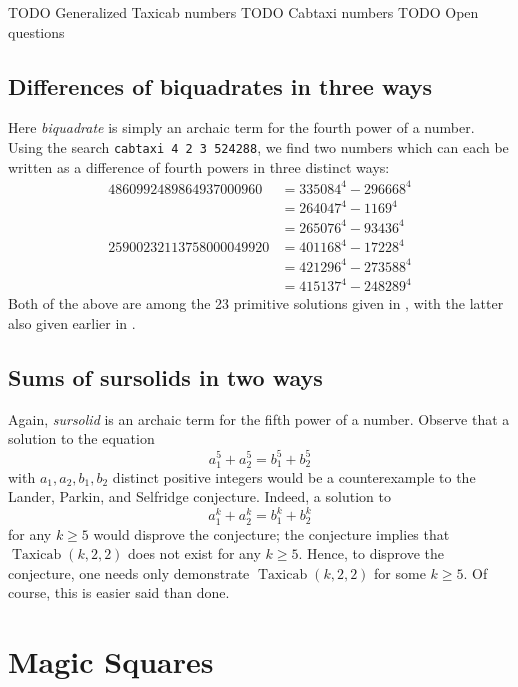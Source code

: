 \documentclass[11pt]{amsart}
\begin{document}
TODO Generalized Taxicab numbers
TODO Cabtaxi numbers
TODO Open questions

\subsection{Differences of biquadrates in three ways}
Here \emph{biquadrate} is simply an archaic term for the fourth power of a number. Using the search \texttt{cabtaxi 4 2 3 524288}, we find two numbers which can each be written as a difference of fourth powers in three distinct ways:
\begin{align*}
  4860992489864937000960 &= 335084^4 - 296668^4 \\
  &= 264047^4 - 1169^4 \\
  &= 265076^4 - 93436^4 \\
  25900232113758000049920 &= 401168^4 - 17228^4 \\
  &= 421296^4 - 273588^4 \\
  &= 415137^4 - 248289^4
\end{align*}
Both of the above are among the 23 primitive solutions given in \cite{CW07}, with the latter also given earlier in \cite{Zaj83}.

\subsection{Sums of sursolids in two ways}
Again, \emph{sursolid} is an archaic term for the fifth power of a number. Observe that a solution to the equation
\begin{equation*}
  a_1^5 + a_2^5 = b_1^5 + b_2^5
\end{equation*}
with $a_1, a_2, b_1, b_2$ distinct positive integers would be a counterexample to the Lander, Parkin, and Selfridge conjecture. Indeed, a solution to
\begin{equation*}
  a_1^k + a_2^k = b_1^k + b_2^k
\end{equation*}
for any $k \geq 5$ would disprove the conjecture; the conjecture implies that $\operatorname{Taxicab}(k, 2, 2)$ does not exist for any $k \geq 5$. Hence, to disprove the conjecture, one needs only demonstrate $\operatorname{Taxicab}(k, 2, 2)$ for some $k \geq 5$. Of course, this is easier said than done.

\section{Magic Squares}
\end{document}
